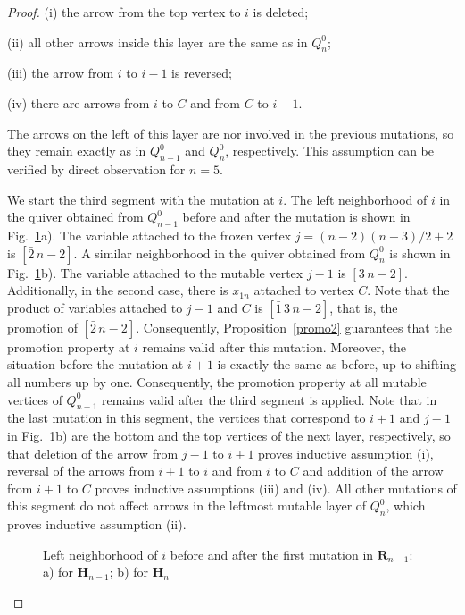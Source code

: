 \documentclass[10pt,a4paper]{amsart}
\def\Hs{\mathbf H}
\def\Rs{\mathbf R}
\begin{document}
\begin{proof}
(i) the arrow from the top vertex to $i$ is deleted; 

(ii) all other arrows inside this layer are the same as in $Q_{n}^0$;

(iii) the arrow from $i$ to $i-1$ is reversed; 

(iv) there are arrows  from $i$ to $C$ and from $C$ to $i-1$. 

\noindent The arrows on the left of this layer are nor involved in the previous mutations, so they remain exactly as in  $Q_{n-1}^0$ and $Q_n^0$, respectively. This assumption can be verified by direct observation for $n=5$.

We start the third segment with the mutation at $i$. The left neighborhood of $i$ in the quiver obtained from $Q_{n-1}^0$ before and after the mutation is shown in Fig.~\ref{ileft}a). The variable attached to the frozen vertex 
$j=(n-2)(n-3)/2+2$ is $[\bar2\,n-2]$. A similar neighborhood in the quiver obtained from $Q_{n}^0$ is shown in 
Fig.~\ref{ileft}b). The variable attached to the mutable vertex $j-1$ is $[3\,n-2]$. Additionally, in the second case, there is $x_{1n}$ attached to vertex $C$. Note that the product of variables attached to $j-1$ and $C$ is $[\bar1\,3\,n-2]$, that is, the promotion of  $[\bar2\,n-2]$. Consequently, Proposition~\ref{promo2} guarantees that the promotion property at $i$ remains valid after this mutation. Moreover, the situation before the mutation at $i+1$ is exactly the same as before, up to shifting all numbers up by one. Consequently, the promotion property at all mutable vertices of 
$Q_{n-1}^0$ remains valid after the third segment is applied. Note that in the last mutation in this segment, the vertices that correspond to $i+1$ and $j-1$ in Fig.~\ref{ileft}b) are the bottom and the top vertices of the next layer, respectively, so that deletion of the arrow from $j-1$ to $i+1$ proves inductive assumption (i), reversal 
of the arrows from $i+1$ to $i$ and from $i$ to $C$ and addition of the arrow from $i+1$ to $C$ proves inductive assumptions (iii) and (iv). All other mutations of this segment do not affect arrows in the leftmost mutable layer of 
$Q_n^0$, which proves inductive assumption (ii). 

\begin{figure}[ht]
\begin{center}

\caption{Left neighborhood of $i$ before and after the first mutation in $\Rs_{n-1}$: a) for $\Hs_{n-1}$; 
b) for $\Hs_n$}
\label{ileft}
\end{center}
\end{figure}


\end{proof}
\end{document}
